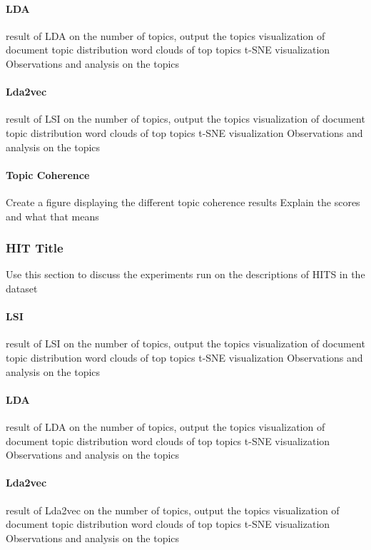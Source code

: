 \documentclass[letterpaper,12pt]{article}
\begin{document}
\paragraph{LDA}
result of LDA on the number of topics, output the topics
visualization of document topic distribution
word clouds of top topics
t-SNE visualization
Observations and analysis on the topics

\paragraph{Lda2vec}
result of LSI on the number of topics, output the topics
visualization of document topic distribution
word clouds of top topics
t-SNE visualization
Observations and analysis on the topics

\paragraph{Topic Coherence}
Create a figure displaying the different topic coherence results
Explain the scores and what that means

\subsubsection{HIT Title}
Use this section to discuss the experiments run on the descriptions of HITS in the dataset

\paragraph{LSI}
result of LSI on the number of topics, output the topics
visualization of document topic distribution
word clouds of top topics
t-SNE visualization
Observations and analysis on the topics

\paragraph{LDA}
result of LDA on the number of topics, output the topics
visualization of document topic distribution
word clouds of top topics
t-SNE visualization
Observations and analysis on the topics

\paragraph{Lda2vec}
result of Lda2vec on the number of topics, output the topics
visualization of document topic distribution
word clouds of top topics
t-SNE visualization
Observations and analysis on the topics
\end{document}
